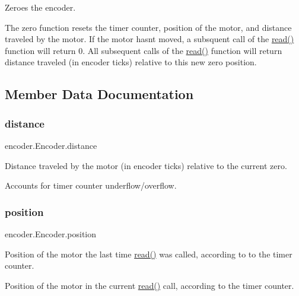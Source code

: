 Zeroes the encoder. 

The zero function resets the timer counter, position of the motor, and distance traveled by the motor. If the motor hasn\textquotesingle{}t moved, a subsquent call of the \mbox{\hyperlink{classencoder_1_1Encoder_aa1c1535160682500f5214f45d8197027}{read()}} function will return 0. All subsequent calls of the \mbox{\hyperlink{classencoder_1_1Encoder_aa1c1535160682500f5214f45d8197027}{read()}} function will return distance traveled (in encoder ticks) relative to this new zero position. 

\subsection{Member Data Documentation}
\mbox{\label{classencoder_1_1Encoder_ac16be7b70ef28d19b75108d422f82e28}} 
\subsubsection{\texorpdfstring{distance}{distance}}
{\footnotesize\ttfamily encoder.\+Encoder.\+distance}



Distance traveled by the motor (in encoder ticks) relative to the current zero. 

Accounts for timer counter underflow/overflow. \mbox{\label{classencoder_1_1Encoder_a9c15eb087b5869c188cf94e53ea3b4f5}} 
\subsubsection{\texorpdfstring{position}{position}}
{\footnotesize\ttfamily encoder.\+Encoder.\+position}



Position of the motor the last time \mbox{\hyperlink{classencoder_1_1Encoder_aa1c1535160682500f5214f45d8197027}{read()}} was called, according to to the timer counter. 

Position of the motor in the current \mbox{\hyperlink{classencoder_1_1Encoder_aa1c1535160682500f5214f45d8197027}{read()}} call, according to the timer counter.\mbox{\label{classencoder_1_1Encoder_a2057baa7c3e6631e2fb30680486a2403}} 
